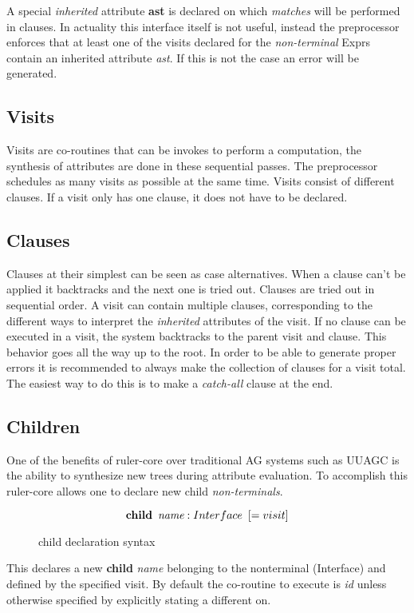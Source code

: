 A special \emph{inherited} attribute \textbf{ast} is declared on which \emph{matches} will be performed in clauses. In actuality this interface itself is not useful, instead the preprocessor enforces that at least one of the visits declared for the \emph{non-terminal} Exprs contain an inherited attribute \emph{ast}. If this is not the case an error will be generated.
\subsection{Visits}
Visits are co-routines that can be invokes to perform a computation, the synthesis of attributes are done in these sequential passes. The preprocessor schedules as many visits as possible at the same time. Visits consist of different clauses. If a visit only has one clause, it does not have to be declared. 
\subsection{Clauses}
Clauses at their simplest can be seen as case alternatives. When a clause can't be applied it backtracks and the next one is tried out. Clauses are tried out in sequential order.
A visit can contain multiple clauses, corresponding to the different ways to interpret the \emph{inherited} attributes of the visit.
If no clause can be executed in a visit, the system backtracks to the parent visit and clause. This behavior goes all the way up to the root. In order to be able to generate proper errors it is recommended to always make the collection of clauses for a visit total. The easiest way to do this is to make a \emph{catch-all} clause at the end.
\subsection{Children}
One of the benefits of ruler-core over traditional AG systems such as UUAGC is the ability to synthesize new trees during attribute evaluation. To accomplish this ruler-core allows one to declare new child \emph{non-terminals}.

\begin{figure}[h!]
\[
\textbf{child} \hspace{5pt} \emph{name} : Interface \hspace{5pt} [= visit]
\]
\caption{child declaration syntax}
\end{figure}

This declares a new \textbf{child} \emph{name} belonging to the nonterminal (Interface) and defined by the specified visit\cite{visitag}. By default the co-routine to execute is \emph{id} unless otherwise specified by explicitly stating a different on. 

